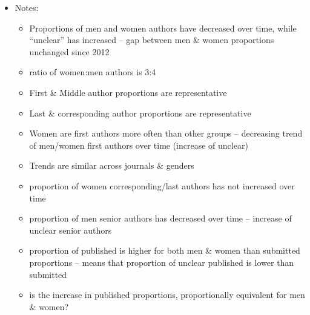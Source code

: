 \documentclass[11pt,]{article}
\providecommand{\tightlist}{%
  \setlength{\itemsep}{0pt}\setlength{\parskip}{0pt}}
\begin{document}
\begin{itemize}
\tightlist
\item
  Notes:

  \begin{itemize}
  \tightlist
  \item
    Proportions of men and women authors have decreased over time, while
    ``unclear'' has increased -- gap between men \& women proportions
    unchanged since 2012
  \item
    ratio of women:men authors is 3:4
  \item
    First \& Middle author proportions are representative
  \item
    Last \& corresponding author proportions are representative
  \item
    Women are first authors more often than other groups -- decreasing
    trend of men/women first authors over time (increase of unclear)
  \item
    Trends are similar across journals \& genders
  \item
    proportion of women corresponding/last authors has not increased
    over time
  \item
    proportion of men senior authors has decreased over time -- increase
    of unclear senior authors
  \item
    proportion of published is higher for both men \& women than
    submitted proportions -- means that proportion of unclear published
    is lower than submitted
  \item
    is the increase in published proportions, proportionally equivalent
    for men \& women?
  \end{itemize}
\end{itemize}
\end{document}
